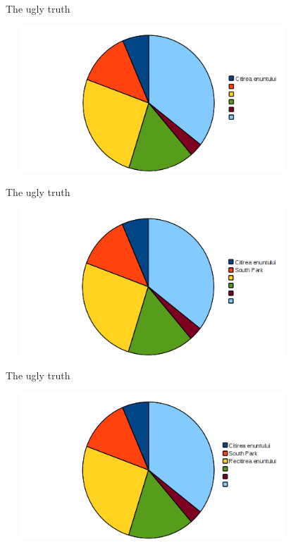 \documentclass{beamer}
\begin{document}
\begin{frame}{The ugly truth}
\begin{center}
\includegraphics[height=5.5cm, width=11cm]{img/Step2.png}
\end{center}
\end{frame}

\begin{frame}{The ugly truth}
\begin{center}
\includegraphics[height=5.5cm, width=11cm]{img/Step3.png}
\end{center}
\end{frame}

\begin{frame}{The ugly truth}
\begin{center}
\includegraphics[height=5.5cm, width=11cm]{img/Step4.png}
\end{center}
\end{frame}
\end{document}
